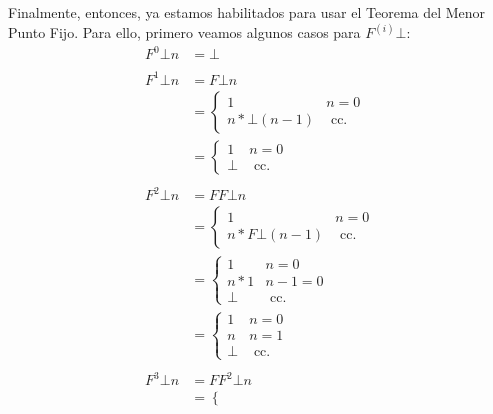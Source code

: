 \documentclass{article}
\begin{document}
Finalmente, entonces, ya estamos habilitados para usar el Teorema del Menor Punto Fijo.
Para ello, primero veamos algunos casos para $F^{(i)} \bot$:
\begin{equation*}
	\begin{aligned}
		F^0 \bot n & = \bot                               \\
		\\
		F^1 \bot n & = F \bot n                           \\
		           & = \begin{cases}
			               1               & n = 0        \\
			               n * \bot(n - 1) & \text{ cc. }
		               \end{cases}     \\
		           & = \begin{cases}
			               1    & n = 0        \\
			               \bot & \text{ cc. }
		               \end{cases}                \\
		\\
		F^2 \bot n & = F F \bot n                         \\
		           & = \begin{cases}
			               1                  & n = 0        \\
			               n * F \bot (n - 1) & \text{ cc. }
		               \end{cases}  \\
		           & = \begin{cases}
			               1     & n = 0        \\
			               n * 1 & n-1 = 0      \\
			               \bot  & \text{ cc. }
		               \end{cases}               \\
		           & = \begin{cases}
			               1    & n = 0        \\
			               n    & n = 1        \\
			               \bot & \text{ cc. }
		               \end{cases}                \\
		\\
		F^3 \bot n & = F F^2 \bot n                       \\
		           & = \begin{cases}

\end{cases}
\end{aligned}
\end{equation*}
\end{document}
